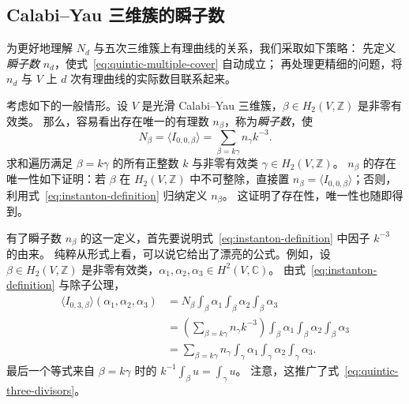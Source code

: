 \subsection{Calabi--Yau 三维簇的瞬子数}\label{subsec:instanton-numbers}
为更好地理解 $N_d$ 与五次三维簇上有理曲线的关系，我们采取如下策略：
先定义\emph{瞬子数} $n_d$，使式~\eqref{eq:quintic-multiple-cover} 自动成立；
再处理更精细的问题，将 $n_d$ 与 $V$ 上 $d$ 次有理曲线的实际数目联系起来。

考虑如下的一般情形。设 $V$ 是光滑 Calabi--Yau 三维簇，$\beta\in H_2(V,\mathbb Z)$ 是非零有效类。
那么，容易看出存在唯一的有理数 $n_\beta$，称为\emph{瞬子数}，使
\begin{equation}\label{eq:instanton-definition}
N_\beta=\langle I_{0,0,\beta}\rangle=\sum_{\beta=k\gamma}n_\gamma k^{-3}.
\end{equation}
求和遍历满足 $\beta=k\gamma$ 的所有正整数 $k$ 与非零有效类 $\gamma\in H_2(V,\mathbb Z)$。
$n_\beta$ 的存在唯一性如下证明：若 $\beta$ 在 $H_2(V,\mathbb Z)$ 中不可整除，直接置
$n_\beta=\langle I_{0,0,\beta}\rangle$；否则，利用式~\eqref{eq:instanton-definition} 归纳定义 $n_\beta$。
这证明了存在性，唯一性也随即得到。

有了瞬子数 $n_\beta$ 的这一定义，首先要说明式~\eqref{eq:instanton-definition} 中因子 $k^{-3}$ 的由来。
纯粹从形式上看，可以说它给出了漂亮的公式。例如，设 $\beta\in H_2(V,\mathbb Z)$
是非零有效类，$\alpha_1,\alpha_2,\alpha_3\in H^2(V,\mathbb C)$。
由式~\eqref{eq:instanton-definition} 与除子公理，
\begin{equation}\label{eq:instanton-three-divisors}
\begin{aligned}
\langle I_{0,3,\beta}\rangle(\alpha_1,\alpha_2,\alpha_3)
&=N_\beta\int_\beta\alpha_1\int_\beta\alpha_2\int_\beta\alpha_3\\
&=\left(\sum_{\beta=k\gamma}n_\gamma k^{-3}\right)
\int_\beta\alpha_1\int_\beta\alpha_2\int_\beta\alpha_3\\
&=\sum_{\beta=k\gamma}n_\gamma\int_\gamma\alpha_1\int_\gamma\alpha_2\int_\gamma\alpha_3.
\end{aligned}
\end{equation}
最后一个等式来自 $\beta=k\gamma$ 时的 $k^{-1}\int_\beta u=\int_\gamma u$。
注意，这推广了式~\eqref{eq:quintic-three-divisors}。

